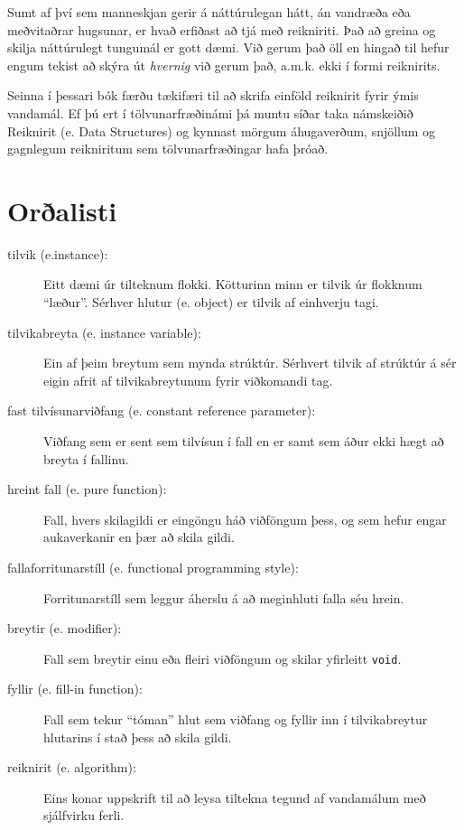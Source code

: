 Sumt af því sem manneskjan gerir á náttúrulegan hátt, án vandræða eða meðvitaðrar hugsunar, er hvað erfiðast að tjá með reikniriti.
Það að greina og skilja náttúrulegt tungumál er gott dæmi.
Við gerum það öll en hingað til hefur engum tekist að skýra út {\em hvernig} við gerum það, a.m.k. ekki í formi reiknirits.

Seinna í þessari bók færðu tækifæri til að skrifa einföld reiknirit fyrir ýmis vandamál.
Ef þú ert í tölvunarfræðinámi þá muntu síðar taka námskeiðið Reiknirit (e. Data Structures) og kynnast
mörgum áhugaverðum, snjöllum og gagnlegum reikniritum sem tölvunarfræðingar hafa þróað.

\section{Orðalisti}

\begin{description}

\item[tilvik (e.instance):]  Eitt dæmi úr tilteknum flokki.  Kötturinn minn er tilvik úr flokknum ``læður''. 
Sérhver hlutur (e. object) er tilvik af einhverju tagi.

\item[tilvikabreyta (e. instance variable):]  Ein af þeim breytum sem mynda strúktúr. Sérhvert tilvik af strúktúr á sér eigin afrit af tilvikabreytunum fyrir viðkomandi tag.

\item[fast tilvísunarviðfang (e. constant reference parameter):]  Viðfang sem er sent sem tilvísun í fall en er samt sem áður ekki hægt að breyta í fallinu.

\item[hreint fall (e. pure function):]  Fall, hvers skilagildi er eingöngu háð viðföngum þess, og sem hefur engar aukaverkanir en þær að skila gildi.

\item[fallaforritunarstíll (e. functional programming style):]  Forritunarstíll sem leggur áherslu á að meginhluti falla séu hrein.

\item[breytir (e. modifier):]  Fall sem breytir einu eða fleiri viðföngum og skilar yfirleitt {\tt void}.

\item[fyllir (e. fill-in function):]  Fall sem tekur ``tóman'' hlut sem viðfang og fyllir inn í tilvikabreytur hlutarins í stað þess að skila gildi.

\item[reiknirit (e. algorithm):]  Eins konar uppskrift til að leysa tiltekna tegund af vandamálum með sjálfvirku ferli.


\end{description}


